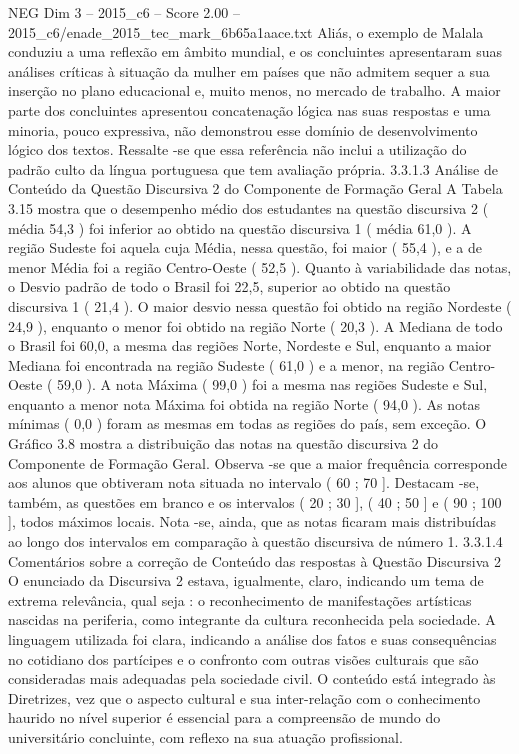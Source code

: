 \begin{textsample}{NEG Dim 3 – 2015\_c6 – Score 2.00 – 2015\_c6/enade\_2015\_tec\_mark\_6b65a1aace.txt}
Aliás, o exemplo de Malala conduziu a uma reflexão em âmbito mundial, e os concluintes apresentaram suas análises críticas à situação da mulher em países que não admitem sequer a sua inserção no plano educacional e, muito menos, no mercado de trabalho.
A maior parte dos concluintes apresentou concatenação lógica nas suas respostas e uma minoria, pouco expressiva, não demonstrou esse domínio de desenvolvimento lógico dos textos.
Ressalte -se que essa referência não inclui a utilização do padrão culto da língua portuguesa que tem avaliação própria. 3.3.1.3 Análise de Conteúdo da Questão Discursiva 2 do Componente de Formação Geral A Tabela 3.15 mostra que o desempenho médio dos estudantes na questão discursiva 2 ( média 54,3 ) foi inferior ao obtido na questão discursiva 1 ( média 61,0 ).
A região Sudeste foi aquela cuja Média, nessa questão, foi maior ( 55,4 ), e a de menor Média foi a região Centro-Oeste ( 52,5 ).
Quanto à variabilidade das notas, o Desvio padrão de todo o Brasil foi 22,5, superior ao obtido na questão discursiva 1 ( 21,4 ).
O maior desvio nessa questão foi obtido na região Nordeste ( 24,9 ), enquanto o menor foi obtido na região Norte ( 20,3 ).
A Mediana de todo o Brasil foi 60,0, a mesma das regiões Norte, Nordeste e Sul, enquanto a maior Mediana foi encontrada na região Sudeste ( 61,0 ) e a menor, na região Centro-Oeste ( 59,0 ).
A nota Máxima ( 99,0 ) foi a mesma nas regiões Sudeste e Sul, enquanto a menor nota Máxima foi obtida na região Norte ( 94,0 ).
As notas mínimas ( 0,0 ) foram as mesmas em todas as regiões do país, sem exceção.
O Gráfico 3.8 mostra a distribuição das notas na questão discursiva 2 do Componente de Formação Geral.
Observa -se que a maior frequência corresponde aos alunos que obtiveram nota situada no intervalo ( 60 ; 70 ].
Destacam -se, também, as questões em branco e os intervalos ( 20 ; 30 ], ( 40 ; 50 ] e ( 90 ; 100 ], todos máximos locais.
Nota -se, ainda, que as notas ficaram mais distribuídas ao longo dos intervalos em comparação à questão discursiva de número 1. 3.3.1.4 Comentários sobre a correção de Conteúdo das respostas à Questão Discursiva 2 O enunciado da Discursiva 2 estava, igualmente, claro, indicando um tema de extrema relevância, qual seja : o reconhecimento de manifestações artísticas nascidas na periferia, como integrante da cultura reconhecida pela sociedade.
A linguagem utilizada foi clara, indicando a análise dos fatos e suas consequências no cotidiano dos partícipes e o confronto com outras visões culturais que são consideradas mais adequadas pela sociedade civil.
O conteúdo está integrado às Diretrizes, vez que o aspecto cultural e sua inter-relação com o conhecimento haurido no nível superior é essencial para a compreensão de mundo do universitário concluinte, com reflexo na sua atuação profissional.

\end{textsample}
